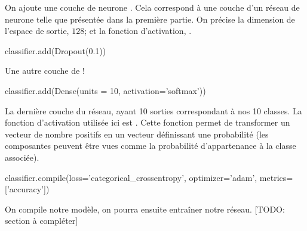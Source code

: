 On ajoute une couche de neurone . 
Cela correspond à une couche d'un réseau de neurone telle que présentée 
dans la première partie. 
On précise la dimension de l'espace de sortie, $128$; et la fonction 
d'activation, .

\begin{codeblock}
classifier.add(Dropout(0.1)) 
\end{codeblock}

Une autre couche de  !


\begin{codeblock}
classifier.add(Dense(units = 10, activation='softmax'))
\end{codeblock}

La dernière couche du réseau, ayant 10 sorties correspondant à nos 10 classes. 
La fonction d'activation utilisée ici est . 
Cette fonction permet de transformer un vecteur de nombre positifs en 
un vecteur définissant une probabilité (les composantes peuvent être 
vues comme la probabilité d'appartenance à la classe associée).
    
	
\begin{codeblock}
classifier.compile(loss='categorical_crossentropy', optimizer='adam', metrics=['accuracy'])
\end{codeblock}

On compile notre modèle, on pourra ensuite entraîner notre réseau. 
[TODO: section à compléter]
